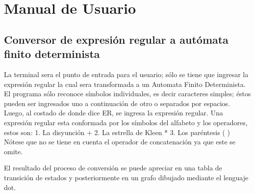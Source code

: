 \documentclass[a4paper,10pt]{article}
\title{}
\author{}
\begin{document}
\section{Manual de Usuario}
\subsection{Conversor de expresión regular a autómata finito determinista}
La terminal sera el punto de entrada para el usuario; sólo se tiene que ingresar la expresión regular 
la cual sera transformada a un Automata Finito Determinista. El programa sólo
reconoce símbolos individuales, es decir caracteres simples; éstos pueden ser
ingresados uno a continuación de otro o separados por espacios.
Luego, al costado de donde dice ER, se ingresa la expresión regular. Una
expresión regular esta conformada por los símbolos del alfabeto y los
operadores, estos son:
1. La disyunción +
2. La estrella de Kleen *
3. Los paréntesis ( )
Nótese que no se tiene en cuenta el operador de concatenación ya que este se omite.

El resultado del proceso de conversión se puede apreciar en una tabla de
transición de estados y posteriormente en un grafo dibujado mediante el lenguaje dot.
\end{document}
